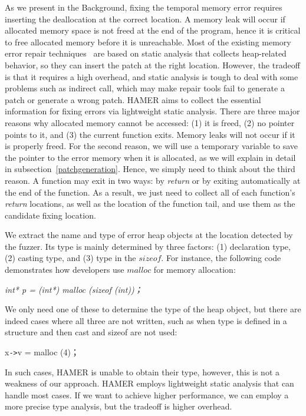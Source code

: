 \documentclass[a4paper,11pt,oneside,openany]{book}
\begin{document}
As we present in the Background, fixing the temporal memory error requires inserting the deallocation at the correct location. A memory leak will occur if allocated memory space is not freed at the end of the program, hence it is critical to free allocated memory before it is unreachable. Most of the existing memory error repair techniques~\cite{SAVER, Memfix} are based on static analysis that collects heap-related behavior, so they can insert the patch at the right location. However, the tradeoff is that it requires a high overhead, and static analysis is tough to deal with some problems such as indirect call, which may make repair tools fail to generate a patch or generate a wrong patch. HAMER aims to collect the essential information for fixing errors via lightweight static analysis. There are three major reasons why allocated memory cannot be accessed: (1) it is freed, (2) no pointer points to it, and (3) the current function exits. Memory leaks will not occur if it is properly freed. For the second reason, we will use a temporary variable to save the pointer to the error memory when it is allocated, as we will explain in detail in subsection~\ref{patchgeneration}. Hence,  we simply need to think about the third reason. A function may exit in two ways: by {\it return} or by exiting automatically at the end of the function. As a result, we just need to collect all of each function's {\it return} locations, as well as the location of the function tail, and use them as the candidate fixing location.



We extract the name and type of error heap objects at the location detected by the fuzzer. Its type is mainly determined by three factors: (1) declaration type, (2) casting type, and (3) type in the $sizeof$. For instance, the following code demonstrates how developers use $malloc$ for memory allocation:


\begin{minipage}{\textwidth}
\vspace{0.2cm}
\textsl{\hspace{0.3cm}int* p = (int*) malloc (sizeof (int))；}
\vspace{0.2cm}
\end{minipage}
We only need one of these to determine the type of the heap object, but there are indeed cases where all three are not written, such as when type is defined in a structure and then cast and sizeof are not used:


\begin{minipage}{\textwidth}
\vspace{0.2cm}
\hspace{0.3cm}x\verb|->|v = malloc (4)；
\vspace{0.2cm}
\end{minipage}
In such cases, HAMER is unable to obtain their type, however, this is not a weakness of our approach. HAMER employs lightweight static analysis that can handle most cases. If we want to achieve higher performance, we can employ a more precise type analysis, but the tradeoff is higher overhead.
\end{document}
